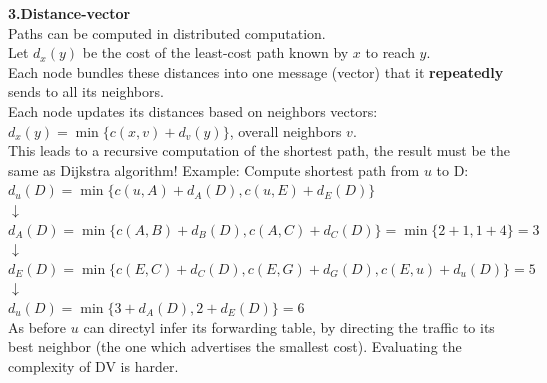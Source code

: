 \documentclass[a4paper, fontsize=8pt, landscape, DIV=1]{scrartcl}
\begin{document}
\begin{multicols*}{4}
		\textbf{3.Distance-vector}\\
		Paths can be computed in distributed computation.\\
		Let $d_x(y)$ be the cost of the least-cost path known by $x$ to reach $y$.
		\\
		Each node bundles these distances into one message (vector) that it
		\textbf{repeatedly} sends to all its neighbors. \\
		Each node updates its distances based on neighbors vectors:\\
		$d_x(y)=\min\{c(x,v)+d_v(y)\}$, overall neighbors $v$.\\
		This leads to a recursive computation of the shortest path, the result
		must be the same as Dijkstra algorithm! 
		Example: Compute shortest path from $u$ to D:\\
		$d_u(D)=\min\{c(u,A)+d_A(D), c(u,E)+d_E(D)\}$\\
		$\downarrow$\\
		$d_A(D)=\min\{c(A,B)+d_B(D), c(A,C)+d_C(D)\}=\min\{2+1,1+4\}=3$\\
		$\downarrow$\\
		$d_E(D)=\min\{c(E,C)+d_C(D), c(E,G)+d_G(D),c(E,u)+d_u(D)\}=5$\\
		$\downarrow$\\
		$d_u(D)=\min\{3+d_A(D), 2+d_E(D)\}=6$\\
		As before $u$ can directyl infer its forwarding table, by directing the
		traffic to its best neighbor (the one which advertises the smallest cost).
		Evaluating the complexity of DV is harder. 
		

\end{multicols*}
\end{document}
